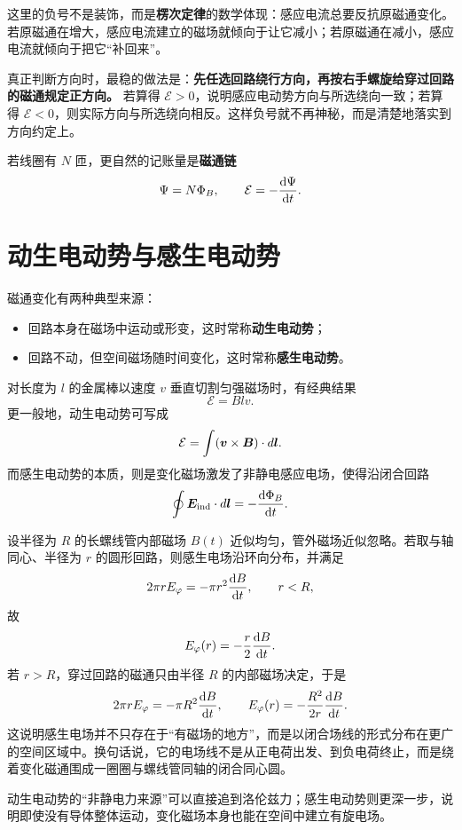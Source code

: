 \documentclass[lang=cn,11pt]{elegantbook}
\begin{document}
这里的负号不是装饰，而是\textbf{楞次定律}的数学体现：感应电流总要反抗原磁通变化。若原磁通在增大，感应电流建立的磁场就倾向于让它减小；若原磁通在减小，感应电流就倾向于把它“补回来”。

\begin{remark}
真正判断方向时，最稳的做法是：\textbf{先任选回路绕行方向，再按右手螺旋给穿过回路的磁通规定正方向。} 若算得 \(\mathcal{E}>0\)，说明感应电动势方向与所选绕向一致；若算得 \(\mathcal{E}<0\)，则实际方向与所选绕向相反。这样负号就不再神秘，而是清楚地落实到方向约定上。
\end{remark}

若线圈有 \(N\) 匝，更自然的记账量是\textbf{磁通链}
\[
\Psi=N\Phi_B,
\qquad
\mathcal{E}=-\dv{\Psi}{t}.
\]

\section{动生电动势与感生电动势}

磁通变化有两种典型来源：
\begin{itemize}
  \item 回路本身在磁场中运动或形变，这时常称\textbf{动生电动势}；
  \item 回路不动，但空间磁场随时间变化，这时常称\textbf{感生电动势}。
\end{itemize}

对长度为 \(l\) 的金属棒以速度 \(v\) 垂直切割匀强磁场时，有经典结果
\[
\mathcal{E}=Blv.
\]
更一般地，动生电动势可写成
\[
\mathcal{E}=\int (\vb*{v}\times \vb*{B})\cdot d\vb*{l}.
\]
而感生电动势的本质，则是变化磁场激发了非静电感应电场，使得沿闭合回路
\[
\oint \vb*{E}_{\mathrm{ind}}\cdot d\vb*{l}=-\dv{\Phi_B}{t}.
\]

\begin{example}
设半径为 \(R\) 的长螺线管内部磁场 \(B(t)\) 近似均匀，管外磁场近似忽略。若取与轴同心、半径为 \(r\) 的圆形回路，则感生电场沿环向分布，并满足
\[
2\pi r E_\varphi=-\pi r^2\dv{B}{t},
\qquad r<R,
\]
故
\[
E_\varphi(r)=-\frac{r}{2}\dv{B}{t}.
\]
若 \(r>R\)，穿过回路的磁通只由半径 \(R\) 的内部磁场决定，于是
\[
2\pi r E_\varphi=-\pi R^2\dv{B}{t},
\qquad
E_\varphi(r)=-\frac{R^2}{2r}\dv{B}{t}.
\]
这说明感生电场并不只存在于“有磁场的地方”，而是以闭合场线的形式分布在更广的空间区域中。换句话说，它的电场线不是从正电荷出发、到负电荷终止，而是绕着变化磁通围成一圈圈与螺线管同轴的闭合同心圆。
\end{example}

\begin{remark}
动生电动势的“非静电力来源”可以直接追到洛伦兹力；感生电动势则更深一步，说明即使没有导体整体运动，变化磁场本身也能在空间中建立有旋电场。
\end{remark}
\end{document}
